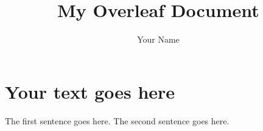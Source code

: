 \documentclass[12pt]{article}
\begin{document}
 

\title{My Overleaf Document}
\author{Your Name}
\date{}

\maketitle

\section*{Your text goes here}
The first sentence goes here.
The second sentence goes here.

\end{document}
